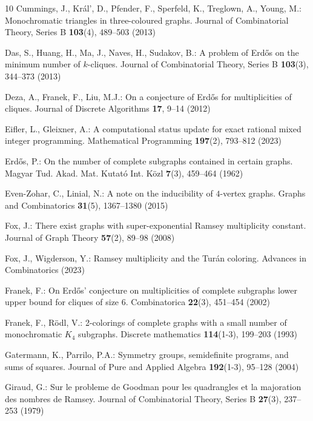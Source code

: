 \documentclass[a4paper,11pt]{article}
\numberwithin{equation}{section}
\begin{document}
\begin{thebibliography}{10}
Cummings, J., Kr{\'a}l', D., Pfender, F., Sperfeld, K., Treglown, A., Young,
  M.: Monochromatic triangles in three-coloured graphs. Journal of
  Combinatorial Theory, Series B  \textbf{103}(4),  489--503 (2013)

Das, S., Huang, H., Ma, J., Naves, H., Sudakov, B.: A problem of Erd{\H{o}}s on
  the minimum number of $k$-cliques. Journal of Combinatorial Theory, Series B
  \textbf{103}(3),  344--373 (2013)

Deza, A., Franek, F., Liu, M.J.: On a conjecture of {E}rd{\H{o}}s for
  multiplicities of cliques. Journal of Discrete Algorithms  \textbf{17},
  9--14 (2012)

Eifler, L., Gleixner, A.: A computational status update for exact rational
  mixed integer programming. Mathematical Programming  \textbf{197}(2),
  793--812 (2023)

Erd\H{o}s, P.: On the number of complete subgraphs contained in certain graphs.
  Magyar Tud. Akad. Mat. Kutat{\'o} Int. K{\"o}zl  \textbf{7}(3),  459--464
  (1962)

Even-Zohar, C., Linial, N.: A note on the inducibility of $4$-vertex graphs.
  Graphs and Combinatorics  \textbf{31}(5),  1367--1380 (2015)

Fox, J.: There exist graphs with super-exponential {R}amsey multiplicity
  constant. Journal of Graph Theory  \textbf{57}(2),  89--98 (2008)

Fox, J., Wigderson, Y.: {R}amsey multiplicity and the {T}ur{\'a}n coloring.
  Advances in Combinatorics  (2023)

Franek, F.: On {{E}rd\H{o}s}' conjecture on multiplicities of complete
  subgraphs lower upper bound for cliques of size 6. Combinatorica
  \textbf{22}(3),  451--454 (2002)

Franek, F., R{\"o}dl, V.: 2-colorings of complete graphs with a small number of
  monochromatic ${K}_4$ subgraphs. Discrete mathematics  \textbf{114}(1-3),
  199--203 (1993)

Gatermann, K., Parrilo, P.A.: Symmetry groups, semidefinite programs, and sums
  of squares. Journal of Pure and Applied Algebra  \textbf{192}(1-3),  95--128
  (2004)

Giraud, G.: Sur le probleme de {G}oodman pour les quadrangles et la majoration
  des nombres de {R}amsey. Journal of Combinatorial Theory, Series B
  \textbf{27}(3),  237--253 (1979)


\end{thebibliography}
\end{document}
